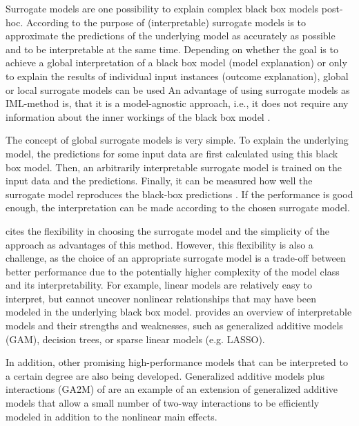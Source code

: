 Surrogate models are one possibility to explain complex black box models post-hoc. According to \citet{Molnar.2019} the purpose of (interpretable) surrogate models is to approximate the predictions of the underlying model as accurately as possible and to be interpretable at the same time.
Depending on whether the goal is to achieve a global interpretation of a black box model (model explanation) or only to explain the results of individual input instances (outcome explanation), global or local surrogate models can be used \citep{Maratea.2021}
An advantage of using surrogate models as IML-method is, that it is a model-agnostic approach, i.e., it does not require any information about the inner workings of the black box model \citep{Molnar.2019}.


The concept of global surrogate models is very simple. To explain the underlying model, the predictions for some input data are first calculated using this black box model. Then, an arbitrarily interpretable surrogate model is trained on the input data and the predictions. Finally, it can be measured how well the surrogate model reproduces the black-box predictions \citep{Molnar.2019}. If the performance is good enough, the interpretation can be made according to the chosen surrogate model.

\citet{Molnar.2019} cites the flexibility in choosing the surrogate model and the simplicity of the approach as advantages of this method. However, this flexibility is also a challenge, as the choice of an appropriate surrogate model is a trade-off between better performance due to the potentially higher complexity of the model class and its interpretability. For example, linear models are relatively easy to interpret, but cannot uncover nonlinear relationships that may have been modeled in the underlying black box model. \citet{Molnar.2019} provides an overview of interpretable models and their strengths and weaknesses, such as generalized additive models (GAM), decision trees, or sparse linear models (e.g. LASSO). 

In addition, other promising high-performance models that can be interpreted to a certain degree are also being developed. Generalized additive models plus interactions (GA2M) of \citet{Lou.2013} are an example of an extension of generalized additive models that allow a small number of two-way interactions to be efficiently modeled in addition to the nonlinear main effects.


